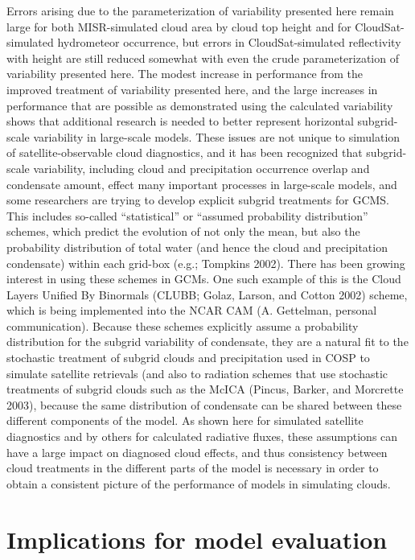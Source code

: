 Errors arising due to the parameterization of variability presented here
remain large for both MISR-simulated cloud area by cloud top height and
for CloudSat-simulated hydrometeor occurrence, but errors in
CloudSat-simulated reflectivity with height are still reduced somewhat
with even the crude parameterization of variability presented here. The
modest increase in performance from the improved treatment of
variability presented here, and the large increases in performance that
are possible as demonstrated using the calculated variability shows that
additional research is needed to better represent horizontal
subgrid-scale variability in large-scale models. These issues are not
unique to simulation of satellite-observable cloud diagnostics, and it
has been recognized that subgrid-scale variability, including cloud and
precipitation occurrence overlap and condensate amount, effect many
important processes in large-scale models, and some researchers are
trying to develop explicit subgrid treatments for GCMS. This includes
so-called ``statistical'' or ``assumed probability distribution''
schemes, which predict the evolution of not only the mean, but also the
probability distribution of total water (and hence the cloud and
precipitation condensate) within each grid-box (e.g.; Tompkins 2002).
There has been growing interest in using these schemes in GCMs. One such
example of this is the Cloud Layers Unified By Binormals (CLUBB; Golaz,
Larson, and Cotton 2002) scheme, which is being implemented into the
NCAR CAM (A. Gettelman, personal communication). Because these schemes
explicitly assume a probability distribution for the subgrid variability
of condensate, they are a natural fit to the stochastic treatment of
subgrid clouds and precipitation used in COSP to simulate satellite
retrievals (and also to radiation schemes that use stochastic treatments
of subgrid clouds such as the McICA (Pincus, Barker, and Morcrette
2003), because the same distribution of condensate can be shared between
these different components of the model. As shown here for simulated
satellite diagnostics and by others for calculated radiative fluxes,
these assumptions can have a large impact on diagnosed cloud effects,
and thus consistency between cloud treatments in the different parts of
the model is necessary in order to obtain a consistent picture of the
performance of models in simulating clouds.

\chapter{Implications for model evaluation}\label{sec:cmip5ux5fchapter}

